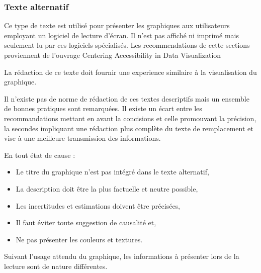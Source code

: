 \documentclass[a4paper,12pt]{article}
\begin{document}
\begin{multicols}{2}
\subsubsection*{Texte alternatif}
\label{sec:org429df55}
Ce type de texte est utilisé pour présenter les graphiques aux utilisateurs employant un logiciel de lecture d'écran. Il n'est pas affiché ni imprimé mais seulement lu par ces logiciels spécialisés.
Les recommendations de cette sections proviennent de l'ouvrage \og Centering Accessibility in Data Visualization\fg{} \autocite{schwabishCenteringAccessibilityData2022}

La rédaction de ce texte doit fournir une experience similaire à la visualisation du graphique.

Il n'existe pas de norme de rédaction de ces textes descriptifs mais un ensemble de bonnes pratiques sont remarquées. Il existe un écart entre les recommandations mettant en avant la concisions et celle promouvant la précision, la secondes impliquant une rédaction plus complète du texte de remplacement et vise à une meilleure transmission des informations.

En tout état de cause :
\begin{itemize}
\item Le titre du graphique n'est pas intégré dans le texte alternatif,
\item La description doit être la plus factuelle et neutre possible,
\item Les incertitudes et estimations doivent être précisées,
\item Il faut éviter toute suggestion de causalité et,
\item Ne pas présenter les couleurs et textures.
\end{itemize}

Suivant l'usage attendu du graphique, les informations à présenter lors de la lecture sont de nature différentes.


\end{multicols}
\end{document}
